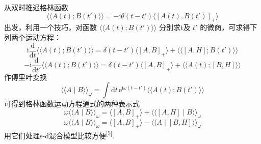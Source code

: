 从双时推迟格林函数
\begin{equation*}
  \langle\langle A(t);B(t')\rangle\rangle
  =-\mathrm{i}\theta(t-t')
  \langle[A(t),B(t')]_{+}\rangle
\end{equation*}
出发，利用一个技巧，对函数 $\langle\langle A(t);B(t')\rangle\rangle$ 分别求t及 $t'$ 的微商，可求得下列两个运动方程：
\begin{equation}
  \mathrm{i}\frac{\mathrm{d}}{\mathrm{d}t}
  \langle\langle A(t);B(t')\rangle\rangle
  =\delta(t-t')\langle[A,B]_{+}\rangle
  +\langle\langle[A,H];B(t')\rangle\rangle
\end{equation}
\begin{equation}
  -\mathrm{i}\frac{\mathrm{d}}{\mathrm{d}t'}
  \langle\langle A(t);B(t')\rangle\rangle
  =\delta(t-t')\langle[A,B]_{+}\rangle
  +\langle\langle A(t);[B,H]\rangle\rangle
\end{equation}
作傅里叶变换
\begin{equation}
  \langle\langle A\mid B\rangle\rangle_{\omega}
  =\int\mathrm{d}t\,\mathrm{e}^{\mathrm{i}\omega(t-t')}
  \langle\langle A(t);B(t')\rangle\rangle
\end{equation}
可得到格林函数运动方程通式的两种表示式
\begin{equation}
  \omega\langle\langle A\mid B\rangle\rangle_{\omega}
  =\langle[A,B]_{+}\rangle
  +\langle\langle[A,H]\mid B\rangle\rangle_{\omega}
\end{equation}
\begin{equation}
  \omega\langle\langle A\mid B\rangle\rangle_{\omega}
  =\langle[A,B]_{+}\rangle
  -\langle\langle A\mid[B,H]\rangle\rangle_{\omega}
\end{equation}
用它们处理s-d混合模型比较方便\textsuperscript{[5]}.

